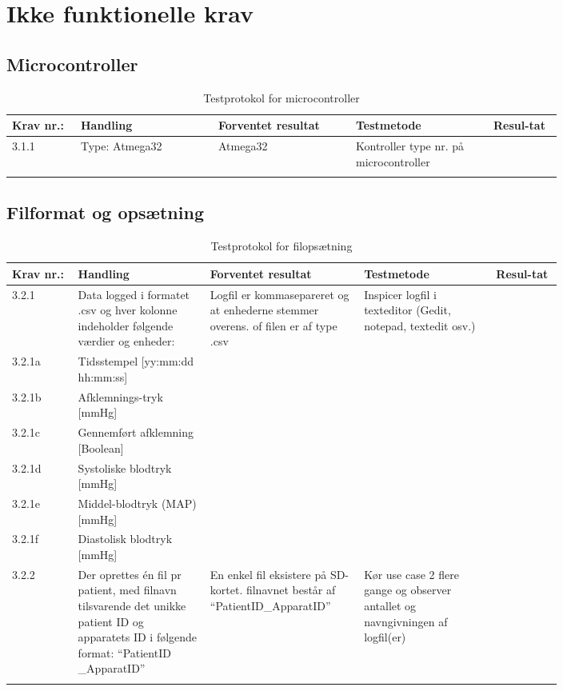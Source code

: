\chapter{Ikke funktionelle krav}
			\section{Microcontroller}
				\begin{longtable}{|p{0.1\linewidth}|p{0.2\linewidth}|p{0.2\linewidth}|p{0.2\linewidth}|p{0.1\linewidth}|}
					\hline
					\rowcolor{usDef}
					Krav nr.: & Handling & Forventet resultat & Testmetode & Resul-tat  \\\hline
					 3.1.1 & Type: Atmega32 & Atmega32 & Kontroller type nr. på microcontroller & \\ \hline
					 \caption{Testprotokol for microcontroller}
				\end{longtable}
			
			\section{Filformat og opsætning}
				\begin{longtable}{|p{0.1\linewidth}|p{0.2\linewidth}|p{0.2\linewidth}|p{0.2\linewidth}|p{0.1\linewidth}|}
					\hline
					\rowcolor{usDef}
					Krav nr.: & Handling & Forventet resultat & Testmetode & Resul-tat  \\\hline
					3.2.1 & Data logged i formatet .csv og hver kolonne indeholder følgende værdier og enheder:  & \multirow{7}{\linewidth}{Logfil er kommasepareret og at enhederne stemmer overens. of filen er af type .csv }&  \multirow{7}{\linewidth}{Inspicer logfil i texteditor (Gedit, notepad, textedit osv.)}& \multirow{7}{\linewidth}{} \\ \cline{1-2}
					3.2.1a& Tidsstempel [yy:mm:dd hh:mm:ss] & &  & \\ \cline{1-2}
					3.2.1b& Afklemnings-tryk [mmHg] & &  & \\ \cline{1-2}
					3.2.1c&  Gennemført afklemning [Boolean] & &  & \\ \cline{1-2}
					3.2.1d&  Systoliske blodtryk [mmHg] & &  & \\ \cline{1-2}
					3.2.1e&  Middel-blodtryk (MAP) [mmHg] & &  & \\ \cline{1-2}
					3.2.1f&  Diastolisk blodtryk [mmHg]  & &  & \\ \hline
					3.2.2 & Der oprettes én fil pr patient, med filnavn tilsvarende det unikke patient ID og apparatets ID i følgende format: “PatientID \_ApparatID”  & En enkel fil eksistere på SD-kortet. filnavnet består af “PatientID\_ApparatID” & Kør use case 2 flere gange og observer antallet og navngivningen af logfil(er)  & \\ \hline
					\caption{Testprotokol for filopsætning}
				\end{longtable}
			
